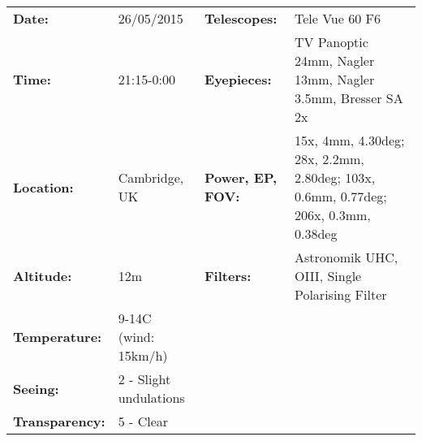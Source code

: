 \begin{tabular}{ p{0.9in} p{1.3in} p{1.2in} p{5.2in}}
{\bf Date:} & 26/05/2015 & {\bf Telescopes:} & Tele Vue 60 F6 \\ 
{\bf Time:} & 21:15-0:00 & {\bf Eyepieces:} & TV Panoptic 24mm, Nagler 13mm, Nagler 3.5mm, Bresser SA 2x \\ 
{\bf Location:} & Cambridge, UK & {\bf Power, EP, FOV:} & 15x, 4mm, 4.30deg; 28x, 2.2mm, 2.80deg; 103x, 0.6mm, 0.77deg; 206x, 0.3mm, 0.38deg \\ 
{\bf Altitude:} & 12m & {\bf Filters:} & Astronomik UHC, OIII, Single Polarising Filter \\ 
{\bf Temperature:} & 9-14C (wind: 15km/h) & & \\ 
{\bf Seeing:} & 2 - Slight undulations & & \\ 
{\bf Transparency:} & 5 - Clear & & \\ 
\end{tabular}
\centering 
